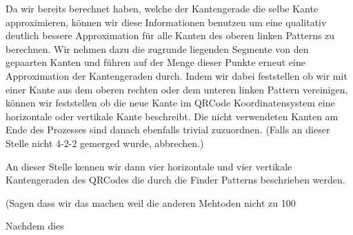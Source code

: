 Da wir bereits berechnet haben, welche der Kantengerade die selbe Kante approximieren, können wir diese Informationen benutzen um eine qualitativ deutlich bessere Approximation für alle Kanten des oberen linken Patterns zu berechnen. Wir nehmen dazu die zugrunde liegenden Segmente von den gepaarten Kanten und führen auf der Menge dieser Punkte erneut eine Approximation der Kantengeraden durch. Indem wir dabei feststellen ob wir mit einer Kante aus dem oberen rechten oder dem unteren linken Pattern vereinigen, können wir feststellen ob die neue Kante im QRCode Koordinatensystem eine horizontale oder vertikale Kante beschreibt. Die nicht verwendeten Kanten am Ende des Prozesses sind danach ebenfalls trivial zuzuordnen. (Falls an dieser Stelle nicht 4-2-2 gemerged wurde, abbrechen.)

An dieser Stelle kennen wir dann vier horizontale und vier vertikale Kantengeraden des QRCodes die durch die Finder Patterns beschrieben werden.

(Sagen dass wir das machen weil die anderen Mehtoden nicht zu 100%

Nachdem dies